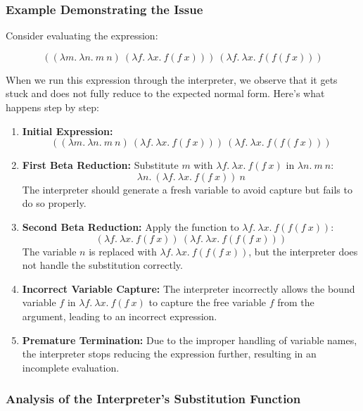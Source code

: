 \documentclass{article}
\begin{document}
\subsubsection*{Example Demonstrating the Issue}

Consider evaluating the expression:

\[
((\lambda m.\ \lambda n.\ m\ n)\ (\lambda f.\ \lambda x.\ f(f\ x)))\ (\lambda f.\ \lambda x.\ f(f(f\ x)))
\]

When we run this expression through the interpreter, we observe that it gets stuck and does not fully reduce to the expected normal form. Here's what happens step by step:

\begin{enumerate}
    \item \textbf{Initial Expression:}
    \[
    ((\lambda m.\ \lambda n.\ m\ n)\ (\lambda f.\ \lambda x.\ f(f\ x)))\ (\lambda f.\ \lambda x.\ f(f(f\ x)))
    \]
    
    \item \textbf{First Beta Reduction:} Substitute \(m\) with \(\lambda f.\ \lambda x.\ f(f\ x)\) in \(\lambda n.\ m\ n\):
    \[
    \lambda n.\ (\lambda f.\ \lambda x.\ f(f\ x))\ n
    \]
    The interpreter should generate a fresh variable to avoid capture but fails to do so properly.

    \item \textbf{Second Beta Reduction:} Apply the function to \(\lambda f.\ \lambda x.\ f(f(f\ x))\):
    \[
    (\lambda f.\ \lambda x.\ f(f\ x))\ (\lambda f.\ \lambda x.\ f(f(f\ x)))
    \]
    The variable \(n\) is replaced with \(\lambda f.\ \lambda x.\ f(f(f\ x))\), but the interpreter does not handle the substitution correctly.

    \item \textbf{Incorrect Variable Capture:} The interpreter incorrectly allows the bound variable \(f\) in \(\lambda f.\ \lambda x.\ f(f\ x)\) to capture the free variable \(f\) from the argument, leading to an incorrect expression.

    \item \textbf{Premature Termination:} Due to the improper handling of variable names, the interpreter stops reducing the expression further, resulting in an incomplete evaluation.
\end{enumerate}

\subsubsection*{Analysis of the Interpreter's Substitution Function}
\end{document}
